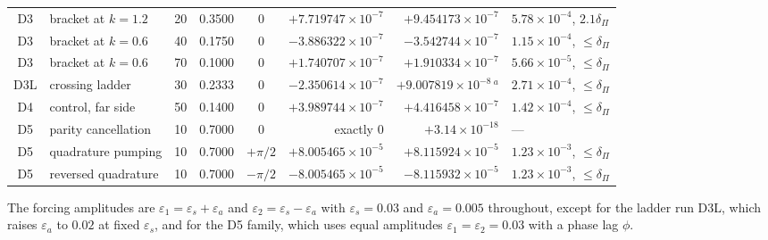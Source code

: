\documentclass[12pt,a4paper]{article}
\newenvironment{ruledtabular}{}{}
\begin{document}
\begin{table}[htb]
\begin{ruledtabular}
\begin{tabular}{@{\hspace{3pt}}clrrcrrl@{\hspace{3pt}}}
  D3  & bracket at $k=1.2$  & 20 & 0.3500 & $0$ & $+7.719747\times10^{-7}$ & $+9.454173\times10^{-7}$ & $5.78\times10^{-4}$, $2.1\delta_\Pi$ \\
  D3  & bracket at $k=0.6$  & 40 & 0.1750 & $0$ & $-3.886322\times10^{-7}$ & $-3.542744\times10^{-7}$ & $1.15\times10^{-4}$, $\le\delta_\Pi$ \\
  D3  & bracket at $k=0.6$  & 70 & 0.1000 & $0$ & $+1.740707\times10^{-7}$ & $+1.910334\times10^{-7}$ & $5.66\times10^{-5}$, $\le\delta_\Pi$ \\
  D3L & crossing ladder     & 30 & 0.2333 & $0$ & $-2.350614\times10^{-7}$ & $+9.007819\times10^{-8}$\,$^{a}$ & $2.71\times10^{-4}$, $\le\delta_\Pi$ \\
  D4  & control, far side   & 50 & 0.1400 & $0$ & $+3.989744\times10^{-7}$ & $+4.416458\times10^{-7}$ & $1.42\times10^{-4}$, $\le\delta_\Pi$ \\
  D5  & parity cancellation & 10 & 0.7000 & $0$ & exactly $0$ & $+3.14\times10^{-18}$ & --- \\
  D5  & quadrature pumping  & 10 & 0.7000 & $+\pi/2$ & $+8.005465\times10^{-5}$ & $+8.115924\times10^{-5}$ & $1.23\times10^{-3}$, $\le\delta_\Pi$ \\
  D5  & reversed quadrature & 10 & 0.7000 & $-\pi/2$ & $-8.005465\times10^{-5}$ & $-8.115932\times10^{-5}$ & $1.23\times10^{-3}$, $\le\delta_\Pi$ \\
  \end{tabular}
  \end{ruledtabular}
\end{table}

The forcing amplitudes are $\varepsilon_1=\varepsilon_s+\varepsilon_a$ and
$\varepsilon_2=\varepsilon_s-\varepsilon_a$ with $\varepsilon_s=0.03$ and
$\varepsilon_a=0.005$ throughout, except for the ladder run D3L, which raises
$\varepsilon_a$ to $0.02$ at fixed $\varepsilon_s$, and for the D5 family, which
uses equal amplitudes $\varepsilon_1=\varepsilon_2=0.03$ with a phase lag
$\phi$.
\end{document}
